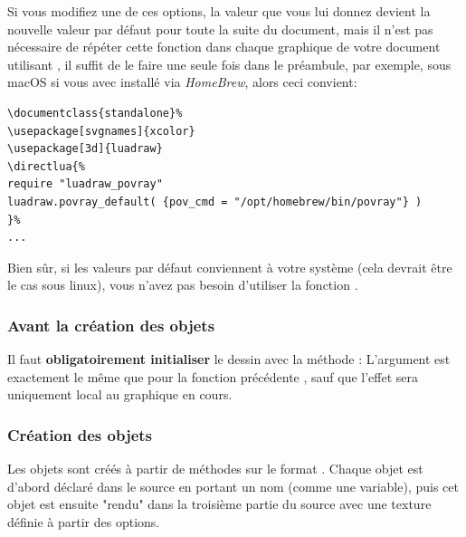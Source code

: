 Si vous modifiez une de ces options, la valeur que vous lui donnez devient la nouvelle valeur par défaut pour toute la suite du document, mais il n'est pas nécessaire de répéter cette fonction dans chaque graphique de votre document utilisant \povray, il suffit de le faire une seule fois dans le préambule, par exemple, sous macOS si vous avec installé \povray via \emph{HomeBrew}, alors ceci convient:

\begin{verbatim}
\documentclass{standalone}%
\usepackage[svgnames]{xcolor}
\usepackage[3d]{luadraw}
\directlua{%
require "luadraw_povray"
luadraw.povray_default( {pov_cmd = "/opt/homebrew/bin/povray"} )
}%
...
\end{verbatim}
Bien sûr, si les valeurs par défaut conviennent à votre système (cela devrait être le cas sous linux), vous n'avez pas besoin d'utiliser la fonction .

\subsubsection{Avant la création des objets}

Il faut \textbf{obligatoirement initialiser} le dessin \povray avec la méthode : 
L'argument  est exactement le même que pour la fonction précédente , sauf que l'effet sera uniquement local au graphique en cours.


\subsubsection{Création des objets}

Les objets sont créés à partir de méthodes sur le format . Chaque objet est d'abord déclaré dans le source \povray en portant un nom (comme une variable), puis cet objet est ensuite "rendu" dans la troisième partie du source avec une texture définie à partir des options.

